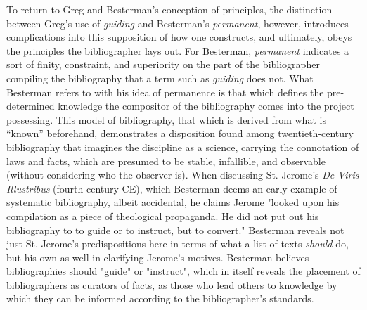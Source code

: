 To return to Greg and Besterman's conception of principles, the distinction between Greg's use of \textit{guiding} and Besterman's \textit{permanent}, however, introduces complications into this supposition of how one constructs, and ultimately, obeys the principles the bibliographer lays out. For Besterman, \textit{permanent} indicates a sort of finity, constraint, and superiority on the part of the bibliographer compiling the bibliography that a term such as \textit{guiding} does not. What Besterman refers to with his idea of permanence is that which defines the pre-determined knowledge the compositor of the bibliography comes into the project possessing. This model of bibliography, that which is derived from what is ``known'' beforehand, demonstrates a disposition found among twentieth-century bibliography that imagines the discipline as a science, carrying the connotation of laws and facts, which are presumed to be stable, infallible, and observable (without considering who the observer is). When discussing St. Jerome's \textit{De Viris Illustribus} (fourth century CE), which Besterman deems an early example of systematic bibliography, albeit accidental, he claims Jerome "looked upon his compilation as a piece of theological propaganda. He did not put out his bibliography to to guide or to instruct, but to convert."\autocite[9]{theodore_besterman_beginnings_1968} Besterman reveals not just St. Jerome's predispositions here in terms of what a list of texts \textit{should} do, but his own as well in clarifying Jerome's motives. Besterman believes bibliographies should "guide" or "instruct", which in itself reveals the placement of bibliographers as curators of facts, as those who lead others to knowledge by which they can be informed according to the bibliographer's standards. 

